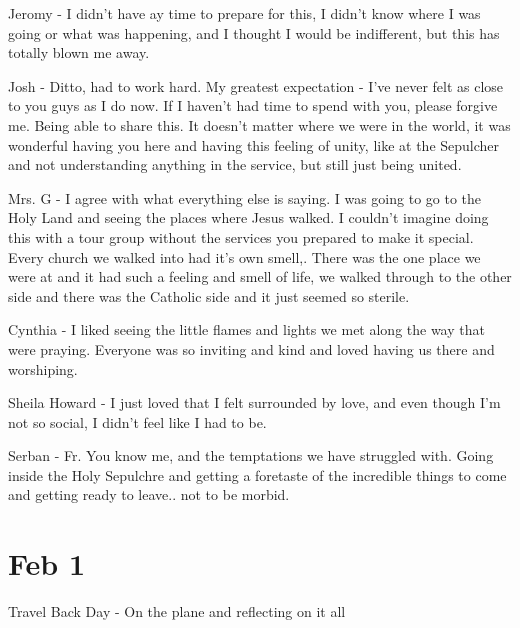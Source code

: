 \documentclass[letterpaper]{report}
\begin{document}
Jeromy - I didn't have ay time to prepare for this, I didn't know where I was going or what was happening,  and I thought I would be indifferent, but this has totally blown me away.

Josh - Ditto,  had to work hard. My greatest expectation - I've never felt as close to you guys as I do now.  If I haven't had time to spend with you, please forgive me. Being able to share this.  It doesn't matter where we were in the world, it was wonderful having you here and having this feeling of unity, like at the Sepulcher and not understanding anything in the service, but still just being united.

Mrs. G - I agree with what everything else is saying.  I was going to go to the Holy Land and seeing the places where Jesus walked. I couldn't imagine doing this with a tour group without the services you prepared to make it special.
Every church we walked into had it's own smell,. There was the one place we were at and it had such a feeling and smell of life, we walked through to the other side and there was the Catholic side and it just seemed so sterile.

Cynthia - I liked seeing the little flames and lights we met along the way that were praying. Everyone was so inviting and kind and loved having us there and worshiping.

Sheila Howard - I just loved that I felt surrounded by love, and even though I'm not so social, I didn't feel like I had to be.

Serban - Fr. You know me, and the temptations we have struggled with. Going inside the Holy Sepulchre and getting a foretaste of the incredible things to come and getting ready to leave.. not to be morbid. 

\section{Feb 1}
Travel Back Day - On the plane and reflecting on it all
\end{document}
